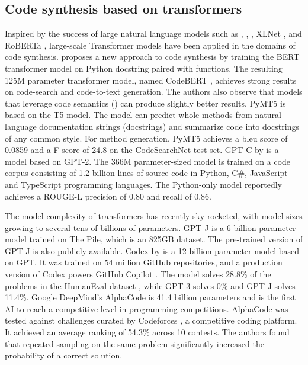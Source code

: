 \subsection{Code synthesis based on transformers}
\label{sec:transformers-for-code-synthesis}
Inspired by the success of large natural language models such as  \cite{peters2018deep},  \cite{radford2018improving},  \cite{devlin2018bert}, XLNet \cite{yang2019xlnet}, and RoBERTa \cite{liu2019roberta}, large-scale Transformer models have been applied in the domains of code synthesis. \textcite{feng2020codebert} proposes a new approach to code synthesis by training the BERT transformer model on Python \gls{docstring} paired with functions. The resulting 125M parameter transformer model, named CodeBERT \cite{feng2020codebert}, achieves strong results on code-search and code-to-text generation. The authors also observe that models that leverage code semantics () can produce slightly better results. PyMT5 \textcite{colin2020pymt5} is based on the T5 model. The model can predict whole methods from natural language documentation strings (docstrings) and summarize code into docstrings of any common style. For method generation, PyMT5 achieves a \gls{bleu} score of 0.0859 and a F-score of 24.8 on the CodeSearchNet \cite{codesearchnet} test set. GPT-C by \textcite{svyatkovskiy2020intellicode} is a model based on GPT-2. The 366M parameter-sized model is trained on a code corpus consisting of 1.2 billion lines of source code in Python, C\#, JavaScript and TypeScript programming languages. The Python-only model reportedly achieves a ROUGE-L precision of 0.80 and recall of 0.86.

The model complexity of transformers has recently sky-rocketed, with model sizes growing to several tens of billions of parameters. GPT-J is a 6 billion parameter model trained on The Pile, which is an 825GB dataset. The pre-trained version of GPT-J is also publicly available. Codex by \textcite{chen2021codex} is a 12 billion parameter model based on GPT. It was trained on 54 million GitHub repositories, and a production version of Codex powers GitHub Copilot \cite{copilot}. The model solves 28.8\% of the problems in the HumanEval dataset \cite{chen2021codex}, while GPT-3 solves 0\% and GPT-J solves 11.4\%. Google DeepMind's AlphaCode \cite{alphacode} is 41.4 billion parameters and is the first AI to reach a competitive level in programming competitions. AlphaCode was tested against challenges curated by Codeforces \cite{codeforces}, a competitive coding platform. It achieved an average ranking of 54.3\% across 10 contests. The authors found that repeated sampling on the same problem significantly increased the probability of a correct solution.


